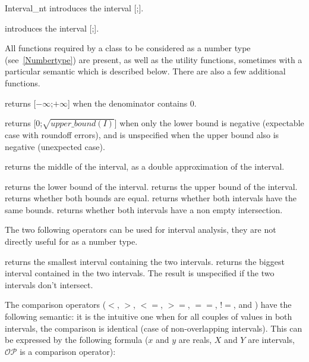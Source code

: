 \begin{ccClass} {Interval_nt}
{introduces the interval [;].}

{introduces the interval [;].}


\ccOperations
{}

All functions required by a class to be considered as a {\cgal} number type
(see~\ref{Numbertype}) are present, as well as the utility functions,
sometimes with a particular semantic which is described below.  There are also
a few additional functions.


 {returns
[$-\infty$;$+\infty$] when the denominator contains 0.}

 {returns
[0;$\sqrt{upper\_bound(I)}$] when only the lower bound is negative (expectable
case with roundoff errors), and is unspecified when the upper bound also is
negative (unexpected case).}

 {returns the
middle of the interval, as a double approximation of the interval.}

 {returns the lower bound of the interval.}
 {returns the upper bound of the interval.}
 {returns whether both bounds are equal.}
 {returns whether both intervals have
the same bounds.}
 {returns whether both intervals
have a non empty intersection.}

The two following operators can be used for interval analysis, they are not
directly useful for  as a number type.

 {returns the smallest
interval containing the two intervals.}
 {returns the biggest
interval contained in the two intervals.  The result is unspecified if
the two intervals don't intersect.}


The comparison operators ($<$, $>$, $<=$, $>=$, $==$, $!=$, 
and ) have the following semantic: it is the intuitive
one when for all couples of values in both intervals, the comparison
is identical (case of non-overlapping intervals).  This can be expressed
by the following formula ($x$ and $y$ are reals, $X$ and $Y$ are
intervals, $\mathcal{OP}$ is a comparison operator):


\end{ccClass}
